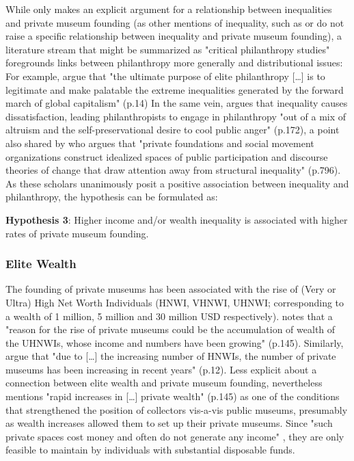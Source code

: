 \documentclass[11pt]{article}
\begin{document}
While only \textcite{Brown_2019_private}  makes an explicit argument for a relationship between inequalities and private museum founding (as other mentions of inequality, such as \textcite{KalbCosmo_2020_museum} or \textcite{Adam_2021_rise} do not raise a specific relationship between inequality and private museum founding), a literature stream that might be summarized as "critical philanthropy studies" foregrounds links between philanthropy more generally and distributional issues:
For example, \textcite{Maclean_etal_2021_philanthropy} argue that "the ultimate purpose of elite philanthropy [\ldots{}] is to legitimate and make palatable the extreme inequalities generated by the forward march of global capitalism" (p.14)
In the same vein, \textcite{Giridharadas_2018_winners} argues that inequality causes dissatisfaction, leading philanthropists to engage in philanthropy "out of a mix of altruism and the self-preservational desire to cool public anger" (p.172), a point also shared by \textcite{KohlArenas_2015_selfhelp} who argues that "private foundations and social movement organizations construct idealized spaces of public participation and discourse theories of change that draw attention away from structural inequality" (p.796). 
As these scholars unanimously posit a positive association between inequality and philanthropy, the hypothesis can be formulated as: 

\bigbreak
\noindent
\textbf{Hypothesis 3}: Higher income and/or wealth inequality is associated with higher rates of private museum founding.



\subsubsection*{Elite Wealth}


The founding of private museums has been associated with the rise of (Very or Ultra) High Net Worth Individuals (HNWI, VHNWI, UHNWI; corresponding to a wealth of 1 million, 5 million and 30 million USD respectively).
\textcite{Gnyp_2015_collectors} notes that a "reason for the rise of private museums could be the accumulation
of wealth of the UHNWIs, whose income and numbers have been growing" (p.145).
Similarly, \textcite{Zorloni_Resch_2016_opportunities} argue that "due to [\ldots{}] the increasing number of HNWIs, the number of private museums has been increasing in recent years" (p.12).
Less explicit about a connection between elite wealth and private museum founding, \textcite{Walker_2019_collector} nevertheless mentions "rapid increases in [\ldots{}] private wealth" (p.145) as one of the conditions that strengthened the position of collectors vis-a-vis public museums, presumably as wealth increases allowed them to set up their private museums. 
Since "such private spaces cost money and often do not generate any income" \parencite[p.145]{Gnyp_2015_collectors}, they are only feasible to maintain by individuals with substantial disposable funds. 
\end{document}
